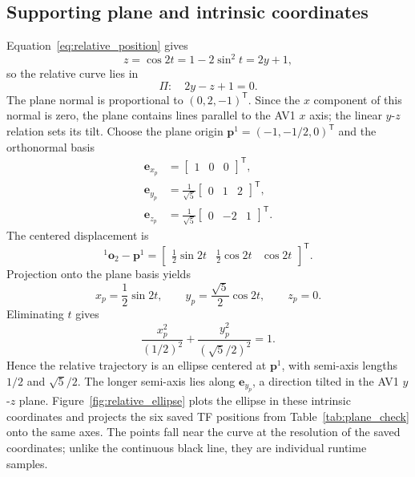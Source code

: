 \documentclass[letterpaper,10pt,conference]{ieeeconf}
\newcommand{\T}{\mathsf{T}}
\begin{document}
\subsection{Supporting plane and intrinsic coordinates}
Equation~\eqref{eq:relative_position} gives
\begin{equation}
z=\cos 2t=1-2\sin^{2}t=2y+1,
\end{equation}
so the relative curve lies in
\begin{equation}
\Pi:\quad 2y-z+1=0.
\label{eq:plane}
\end{equation}
The plane normal is proportional to $(0,2,-1)^{\T}$. Since the $x$ component of this normal is zero, the plane contains lines parallel to the AV1 $x$ axis; the linear $y$-$z$ relation sets its tilt.
Choose the plane origin $\mathbf{p}^{1}=(-1,-1/2,0)^{\T}$ and the orthonormal basis
\begin{align}
\mathbf{e}_{x_p}&=\begin{bmatrix}1&0&0\end{bmatrix}^{\T},\nonumber\\
\mathbf{e}_{y_p}&=\frac{1}{\sqrt{5}}
\begin{bmatrix}0&1&2\end{bmatrix}^{\T},\nonumber\\
\mathbf{e}_{z_p}&=\frac{1}{\sqrt{5}}
\begin{bmatrix}0&-2&1\end{bmatrix}^{\T}.
\end{align}
The centered displacement is
\begin{equation}
{}^{1}\mathbf{o}_{2}-\mathbf{p}^{1}=
\begin{bmatrix}
\tfrac12\sin 2t&\tfrac12\cos 2t&\cos 2t
\end{bmatrix}^{\T}.
\end{equation}
Projection onto the plane basis yields
\begin{equation}
x_p=\frac12\sin 2t,\qquad
y_p=\frac{\sqrt{5}}{2}\cos 2t,\qquad z_p=0.
\label{eq:plane_coordinates}
\end{equation}
Eliminating $t$ gives
\begin{equation}
\frac{x_p^2}{(1/2)^2}+\frac{y_p^2}{(\sqrt{5}/2)^2}=1.
\label{eq:ellipse}
\end{equation}
Hence the relative trajectory is an ellipse centered at $\mathbf{p}^{1}$, with semi-axis lengths $1/2$ and $\sqrt{5}/2$.
The longer semi-axis lies along $\mathbf{e}_{y_p}$, a direction tilted in the AV1 $y$-$z$ plane. Figure~\ref{fig:relative_ellipse} plots the ellipse in these intrinsic coordinates and projects the six saved TF positions from Table~\ref{tab:plane_check} onto the same axes. The points fall near the curve at the resolution of the saved coordinates; unlike the continuous black line, they are individual runtime samples.
\end{document}
